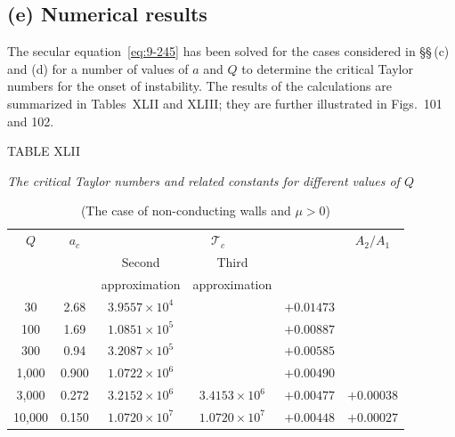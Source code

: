 \subsection*{(e) Numerical results}

The secular equation~\eqref{eq:9-245} has been solved for the cases considered in \S\S\,(c) and (d) for a number of values of $a$ and $Q$ to determine the critical Taylor numbers for the onset of instability. The results of the calculations are summarized in Tables~XLII and XLIII; they are further illustrated in Figs.~101 and 102.

\begin{table}[ht]
\centering
\caption*{TABLE XLII}
\caption*{\textit{The critical Taylor numbers and related constants for different values of $Q$}}
\caption*{(The case of non-conducting walls and $\mu > 0$)}
\begin{tabular}{cccccc}
\hline
$Q$ & $a_c$ & \multicolumn{3}{c}{$\mathscr{T}_c$} & $A_2/A_1$ \\
\cline{3-5}
 & & Second & Third & & \\
 & & approximation & approximation & & \\
\hline
30 & 2.68 & $3.9557 \times 10^4$ & & $+0.01473$ & \\
100 & 1.69 & $1.0851 \times 10^5$ & & $+0.00887$ & \\
300 & 0.94 & $3.2087 \times 10^5$ & & $+0.00585$ & \\
1,000 & 0.900 & $1.0722 \times 10^6$ & & $+0.00490$ & \\
3,000 & 0.272 & $3.2152 \times 10^6$ & $3.4153 \times 10^6$ & $+0.00477$ & $+0.00038$ \\
10,000 & 0.150 & $1.0720 \times 10^7$ & $1.0720 \times 10^7$ & $+0.00448$ & $+0.00027$ \\
\hline
\end{tabular}
\end{table}

